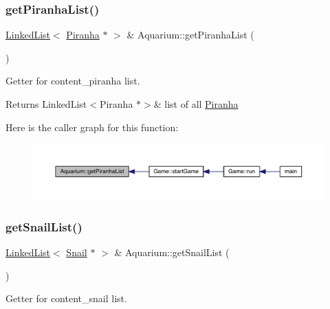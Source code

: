 \subsubsection{\texorpdfstring{get\+Piranha\+List()}{getPiranhaList()}}
{\footnotesize\ttfamily \mbox{\hyperlink{class_linked_list}{Linked\+List}}$<$ \mbox{\hyperlink{class_piranha}{Piranha}} $\ast$ $>$ \& Aquarium\+::get\+Piranha\+List (\begin{DoxyParamCaption}{ }\end{DoxyParamCaption})}



Getter for content\+\_\+piranha list. 

\begin{DoxyReturn}{Returns}
Linked\+List$<$\+Piranha $\ast$$>$\& list of all \mbox{\hyperlink{class_piranha}{Piranha}} 
\end{DoxyReturn}
Here is the caller graph for this function\+:\nopagebreak
\begin{figure}[H]
\begin{center}
\leavevmode
\includegraphics[width=350pt]{class_aquarium_a46c1697b25884c5a91f7a942ae5b3ba7_icgraph}
\end{center}
\end{figure}
\mbox{\label{class_aquarium_a278a38d4cf238908c4e3e170ea66841f}} 
\subsubsection{\texorpdfstring{get\+Snail\+List()}{getSnailList()}}
{\footnotesize\ttfamily \mbox{\hyperlink{class_linked_list}{Linked\+List}}$<$ \mbox{\hyperlink{class_snail}{Snail}} $\ast$ $>$ \& Aquarium\+::get\+Snail\+List (\begin{DoxyParamCaption}{ }\end{DoxyParamCaption})}



Getter for content\+\_\+snail list. 

